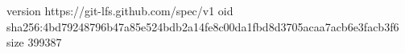 version https://git-lfs.github.com/spec/v1
oid sha256:4bd79248796b47a85e524bdb2a14fe8c00da1fbd8d3705acaa7acb6e3facb3f6
size 399387
